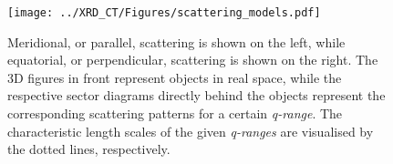 \begin{figure}

    \centering
    \texttt{[image: ../XRD\_CT/Figures/scattering\_models.pdf]}
    \caption[Meridional and Equatorial Scattering]{Meridional, or parallel, scattering is shown on the left, while equatorial, or perpendicular, scattering is shown on the right.
        The 3D figures in front represent objects in real space, while the respective sector diagrams directly behind the objects represent the corresponding scattering patterns for a certain \emph{q-range}.
        The characteristic length scales of the given \emph{q-ranges} are visualised by the dotted lines, respectively.
    }
    \label{fig:scattering_models}
\end{figure}